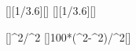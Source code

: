 [\kmph][1/3.6][\mps]
[\kmph][1/3.6][\mps]

[]{\vbX^2/\vaX^2}
[]{100*(\vbX^2-\vaX^2)/\vaX^2}[\percent]
